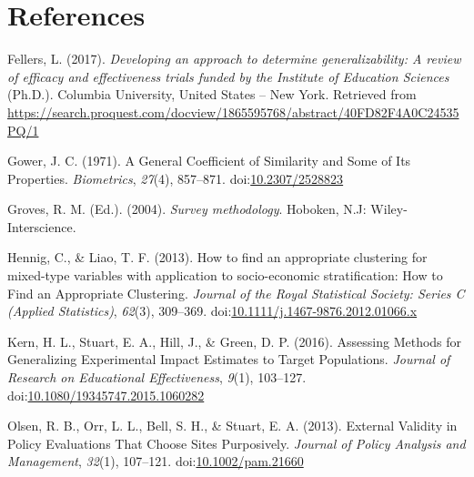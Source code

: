 \documentclass[man,floatsintext]{apa6}
\begin{document}
\newpage

\hypertarget{references}{%
\section{References}\label{references}}

\begingroup
\setlength{\parindent}{-0.5in}
\setlength{\leftskip}{0.5in}

\hypertarget{refs}{}
\leavevmode\hypertarget{ref-fellersDevelopingApproachDetermine2017}{}%
Fellers, L. (2017). \emph{Developing an approach to determine generalizability: A review of efficacy and effectiveness trials funded by the Institute of Education Sciences} (Ph.D.). Columbia University, United States -- New York. Retrieved from \url{https://search.proquest.com/docview/1865595768/abstract/40FD82F4A0C24535PQ/1}

\leavevmode\hypertarget{ref-gowerGeneralCoefficientSimilarity1971}{}%
Gower, J. C. (1971). A General Coefficient of Similarity and Some of Its Properties. \emph{Biometrics}, \emph{27}(4), 857--871. doi:\href{https://doi.org/10.2307/2528823}{10.2307/2528823}

\leavevmode\hypertarget{ref-grovesSurveyMethodology2004}{}%
Groves, R. M. (Ed.). (2004). \emph{Survey methodology}. Hoboken, N.J: Wiley-Interscience.

\leavevmode\hypertarget{ref-hennigHowFindAppropriate2013}{}%
Hennig, C., \& Liao, T. F. (2013). How to find an appropriate clustering for mixed-type variables with application to socio-economic stratification: How to Find an Appropriate Clustering. \emph{Journal of the Royal Statistical Society: Series C (Applied Statistics)}, \emph{62}(3), 309--369. doi:\href{https://doi.org/10.1111/j.1467-9876.2012.01066.x}{10.1111/j.1467-9876.2012.01066.x}

\leavevmode\hypertarget{ref-kernAssessingMethodsGeneralizing2016}{}%
Kern, H. L., Stuart, E. A., Hill, J., \& Green, D. P. (2016). Assessing Methods for Generalizing Experimental Impact Estimates to Target Populations. \emph{Journal of Research on Educational Effectiveness}, \emph{9}(1), 103--127. doi:\href{https://doi.org/10.1080/19345747.2015.1060282}{10.1080/19345747.2015.1060282}

\leavevmode\hypertarget{ref-olsenExternalValidityPolicy2013}{}%
Olsen, R. B., Orr, L. L., Bell, S. H., \& Stuart, E. A. (2013). External Validity in Policy Evaluations That Choose Sites Purposively. \emph{Journal of Policy Analysis and Management}, \emph{32}(1), 107--121. doi:\href{https://doi.org/10.1002/pam.21660}{10.1002/pam.21660}
\end{document}
